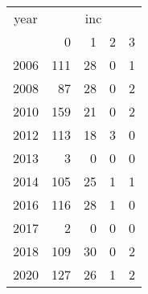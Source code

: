 \footnotesize\begin{tabular}[t]{lrrrr}
\toprule
\multicolumn{1}{c}{year} & \multicolumn{4}{c}{inc} \\
\cmidrule(l{3pt}r{3pt}){1-1} \cmidrule(l{3pt}r{3pt}){2-5}
  & 0 & 1 & 2 & 3\\
\midrule
2006 & 111 & 28 & 0 & 1\\
2008 & 87 & 28 & 0 & 2\\
2010 & 159 & 21 & 0 & 2\\
2012 & 113 & 18 & 3 & 0\\
2013 & 3 & 0 & 0 & 0\\
2014 & 105 & 25 & 1 & 1\\
2016 & 116 & 28 & 1 & 0\\
2017 & 2 & 0 & 0 & 0\\
2018 & 109 & 30 & 0 & 2\\
2020 & 127 & 26 & 1 & 2\\
\bottomrule
\end{tabular}
